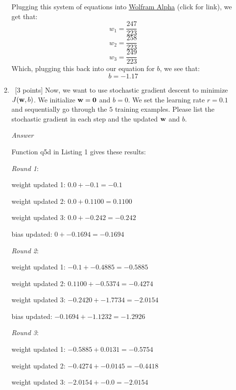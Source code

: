 \documentclass[12pt, fullpage,letterpaper]{article}
\begin{document}
\begin{enumerate}
\begin{enumerate}
    Plugging this system of equations into \href{https://www.wolframalpha.com/input/?i=systems+of+equations+calculator&assumption=%7B%22F%22%2C+%22SolveSystemOf3EquationsCalculator%22%2C+%22equation1%22%7D+-%3E%222-8a%2B4b%2B2c%22&assumption=%22FSelect%22+-%3E+%7B%7B%22SolveSystemOf3EquationsCalculator%22%7D%7D&assumption=%7B%22F%22%2C+%22SolveSystemOf3EquationsCalculator%22%2C+%22equation2%22%7D+-%3E%22-14%2F5%2B4a-36%2F5b%2B6c%22&assumption=%7B%22F%22%2C+%22SolveSystemOf3EquationsCalculator%22%2C+%22equation3%22%7D+-%3E%22106%2F5%2B4a%2B34%2F5b-30c%22}{Wolfram Alpha} (click for link), we get that:
    \[
        w_1 = \frac{247}{223}
    \]
    \[
        w_2 = \frac{258}{223}
    \]
    \[
        w_3 = \frac{249}{223}
    \]
    Which, plugging this back into our equation for $b$, we see that:
    \[
        b = -1.17
    \]
	
	\item~[3 points] Now, we want to use stochastic gradient descent to minimize $J({\bf w}, b)$. We initialize ${\bf w} = {\bf 0}$ and $b = 0$. We set the learning rate $r = 0.1$ and sequentially go through the $5$ training examples. Please list the stochastic gradient in each step and the updated ${\bf w}$ and $b$. 
	
	\emph{Answer}
	
	Function q5d in Listing 1 gives these results:
	
	\emph{Round 1}:
	
	weight updated 1: $0.0 + -0.1 = -0.1$
	
	weight updated 2: $0.0 + 0.1100 = 0.1100$
    
    weight updated 3: $0.0 + -0.242 = -0.242$
    
    bias updated: $0 + -0.1694 = -0.1694$
    
    \emph{Round 2}:
    
    weight updated 1: $-0.1 + -0.4885 = -0.5885$
    
    weight updated 2: $0.1100 + -0.5374 = -0.4274$
    
    weight updated 3: $-0.2420 + -1.7734 = -2.0154$
    
    bias updated: $-0.1694 + -1.1232 = -1.2926$
    
    \emph{Round 3}:
    
    weight updated 1: $-0.5885 + 0.0131 = -0.5754$
    
    weight updated 2: $-0.4274 + -0.0145 = -0.4418$
    
    weight updated 3: $-2.0154 + -0.0 = -2.0154$
    

\end{enumerate}
\end{enumerate}
\end{document}
